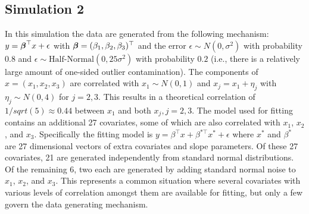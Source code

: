 \documentclass[ba]{imsart}
\def\bbeta{\mbox{\boldmath $\beta$}}
\newcommand{\response}[1]{{\color{blue}#1}}
\begin{document}
\subsection{\response{Simulation 2}}

In this simulation the data are generated from the following mechanism: $y = \bbeta^{\top}x + \epsilon$
with $\bbeta = (\beta_{1}, \beta_{2},\beta_{3})^{\top}$ and the error $\epsilon \sim N(0,\sigma^{2})$ with probability $0.8$ and $\epsilon \sim \text{Half-Normal}(0,25\sigma^{2})$ with probability $0.2$ (i.e., there is a relatively large amount of one-sided outlier contamination). The components of $x = (x_{1}, x_{2}, x_{3})$ are correlated with $x_1 \sim N(0,1)$ and $x_{j} = x_{1} + \eta_{j}$ with $\eta_{j} \sim N(0, 4)$ for $j = 2,3$. This results in a theoretical correlation of $1/sqrt(5) \approx 0.44$ between $x_{1}$ and both $x_{j}, j = 2, 3$. The model used for fitting contains an additional 27 covariates, some of which are also correlated with $x_{1}$, $x_{2}$, and $x_{3}$. Specifically the fitting model is $y = \beta^{\top} x + \beta^{*\top} x^{*} + \epsilon$ where $x^{*}$ and $\beta^{*}$ are 27 dimensional vectors of extra covariates and slope parameters. Of these 27 covariates, 21 are generated independently from standard normal distributions. Of the remaining 6, two each are generated by adding standard normal noise to $x_{1}$, $x_{2}$, and $x_{3}$. This represents a common situation where several covariates with various levels of correlation amongst them are available for fitting, but only a few govern the data generating mechanism.
\end{document}
